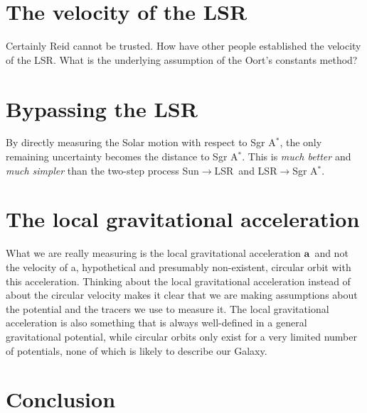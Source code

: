 \documentclass[12pt,preprint]{aastex}
\newcommand{\lsr}{LSR}
\newcommand{\sgra}{Sgr A$^*$}
\renewcommand{\vec}[1]{\mathbf{#1}} %
\newcommand{\aag}{\ensuremath{\vec{a}}}
\begin{document}
\section{The velocity of the \lsr}

Certainly Reid cannot be trusted. How have other people established
the velocity of the \lsr. What is the underlying assumption of the
Oort's constants method?



\section{Bypassing the \lsr}

By directly measuring the Solar motion with respect to \sgra, the only
remaining uncertainty becomes the distance to \sgra. This is
\emph{much better} and \emph{much simpler} than the two-step process
Sun$\rightarrow$\lsr\ and \lsr$\rightarrow$\sgra.

\section{The local gravitational acceleration}

What we are really measuring is the local gravitational acceleration
\aag\ and not the velocity of a, hypothetical and presumably
non-existent, circular orbit with this acceleration. Thinking about
the local gravitational acceleration instead of about the circular
velocity makes it clear that we are making assumptions about the
potential and the tracers we use to measure it. The local
gravitational acceleration is also something that is always
well-defined in a general gravitational potential, while circular
orbits only exist for a very limited number of potentials, none of
which is likely to describe our Galaxy.

\section{Conclusion}



\end{document}

